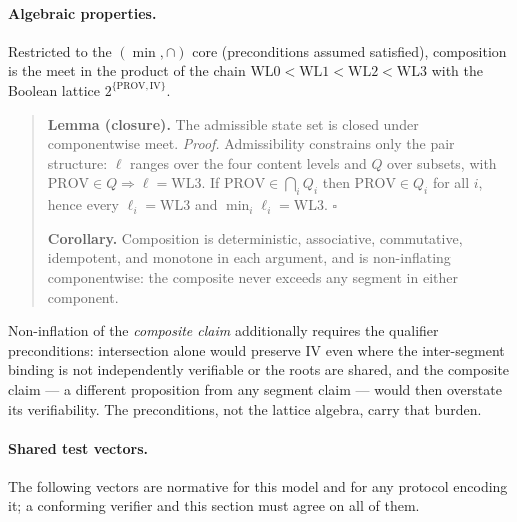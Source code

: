 \documentclass[11pt]{article}
\begin{document}
\paragraph{Algebraic properties.} Restricted to the $(\min, \cap)$ core (preconditions assumed satisfied), composition is the meet in the product of the chain $\mathrm{WL0}<\mathrm{WL1}<\mathrm{WL2}<\mathrm{WL3}$ with the Boolean lattice $2^{\{\mathrm{PROV},\mathrm{IV}\}}$.

\begin{quote}
\textbf{Lemma (closure).} The admissible state set is closed under componentwise meet. \emph{Proof.} Admissibility constrains only the pair structure: $\ell$ ranges over the four content levels and $Q$ over subsets, with $\mathrm{PROV} \in Q \Rightarrow \ell = \mathrm{WL3}$. If $\mathrm{PROV} \in \bigcap_i Q_i$ then $\mathrm{PROV} \in Q_i$ for all $i$, hence every $\ell_i = \mathrm{WL3}$ and $\min_i \ell_i = \mathrm{WL3}$. $\square$

\textbf{Corollary.} Composition is deterministic, associative, commutative, idempotent, and monotone in each argument, and is non-inflating componentwise: the composite never exceeds any segment in either component.
\end{quote}

Non-inflation of the \emph{composite claim} additionally requires the qualifier preconditions: intersection alone would preserve IV even where the inter-segment binding is not independently verifiable or the roots are shared, and the composite claim --- a different proposition from any segment claim --- would then overstate its verifiability. The preconditions, not the lattice algebra, carry that burden.

\paragraph{Shared test vectors.} The following vectors are normative for this model and for any protocol encoding it; a conforming verifier and this section must agree on all of them.
\end{document}

